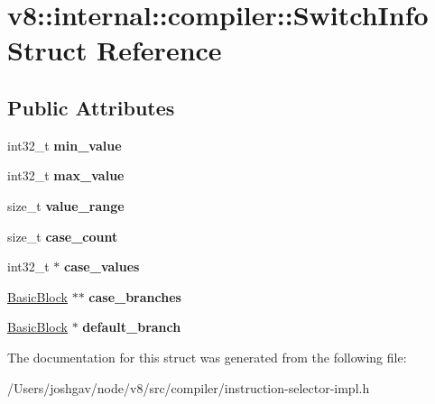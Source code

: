 \hypertarget{structv8_1_1internal_1_1compiler_1_1_switch_info}{}\section{v8\+:\+:internal\+:\+:compiler\+:\+:Switch\+Info Struct Reference}
\label{structv8_1_1internal_1_1compiler_1_1_switch_info}
\subsection*{Public Attributes}
\begin{DoxyCompactItemize}
\item 
int32\+\_\+t {\bfseries min\+\_\+value}\hypertarget{structv8_1_1internal_1_1compiler_1_1_switch_info_ac2514a2dc55e69ba2ac2c652e150c1c6}{}\label{structv8_1_1internal_1_1compiler_1_1_switch_info_ac2514a2dc55e69ba2ac2c652e150c1c6}

\item 
int32\+\_\+t {\bfseries max\+\_\+value}\hypertarget{structv8_1_1internal_1_1compiler_1_1_switch_info_ae1407c2c1e9ec74e9acea3a1a623d9a9}{}\label{structv8_1_1internal_1_1compiler_1_1_switch_info_ae1407c2c1e9ec74e9acea3a1a623d9a9}

\item 
size\+\_\+t {\bfseries value\+\_\+range}\hypertarget{structv8_1_1internal_1_1compiler_1_1_switch_info_a7774d296ba53147b703b0bdc4cd8e5a5}{}\label{structv8_1_1internal_1_1compiler_1_1_switch_info_a7774d296ba53147b703b0bdc4cd8e5a5}

\item 
size\+\_\+t {\bfseries case\+\_\+count}\hypertarget{structv8_1_1internal_1_1compiler_1_1_switch_info_a6f0159d7008cc08af28a01d287a3bae7}{}\label{structv8_1_1internal_1_1compiler_1_1_switch_info_a6f0159d7008cc08af28a01d287a3bae7}

\item 
int32\+\_\+t $\ast$ {\bfseries case\+\_\+values}\hypertarget{structv8_1_1internal_1_1compiler_1_1_switch_info_a6144a0f31bbbe91251e7d514497c0f65}{}\label{structv8_1_1internal_1_1compiler_1_1_switch_info_a6144a0f31bbbe91251e7d514497c0f65}

\item 
\hyperlink{classv8_1_1internal_1_1compiler_1_1_basic_block}{Basic\+Block} $\ast$$\ast$ {\bfseries case\+\_\+branches}\hypertarget{structv8_1_1internal_1_1compiler_1_1_switch_info_add746ba4b07000490aac890f1f96cda3}{}\label{structv8_1_1internal_1_1compiler_1_1_switch_info_add746ba4b07000490aac890f1f96cda3}

\item 
\hyperlink{classv8_1_1internal_1_1compiler_1_1_basic_block}{Basic\+Block} $\ast$ {\bfseries default\+\_\+branch}\hypertarget{structv8_1_1internal_1_1compiler_1_1_switch_info_a1aee236280da59be877b6451df3c2231}{}\label{structv8_1_1internal_1_1compiler_1_1_switch_info_a1aee236280da59be877b6451df3c2231}

\end{DoxyCompactItemize}


The documentation for this struct was generated from the following file\+:\begin{DoxyCompactItemize}
\item 
/\+Users/joshgav/node/v8/src/compiler/instruction-\/selector-\/impl.\+h\end{DoxyCompactItemize}
